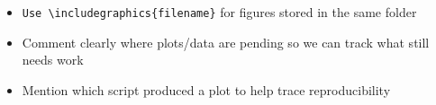 \begin{itemize}
    \item \texttt{Use \textbackslash includegraphics\{filename\}} for figures stored in the same folder
    \item Comment clearly where plots/data are pending so we can track what still needs work
    \item Mention which script produced a plot to help trace reproducibility
\end{itemize}